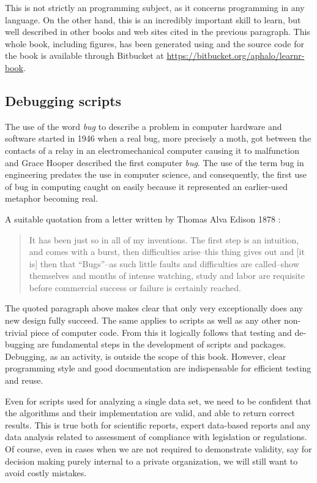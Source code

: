 \documentclass[krantz2]{krantz}\usepackage{knitr}
\begin{document}
This is not strictly an \Rlang programming subject, as it concerns programming in any language. On the other hand, this is an incredibly important skill to learn, but well described in other books and web sites cited in the previous paragraph. This whole book, including figures, has been generated using  and the source code for the book is available through Bitbucket at \url{https://bitbucket.org/aphalo/learnr-book}.

\subsection{Debugging scripts}\label{sec:script:debug}

The use of the word \emph{bug} to describe a problem in computer hardware and software started in 1946 when a real bug, more precisely a moth, got between the contacts of a relay in an electromechanical computer causing it to malfunction and Grace Hooper described the first computer \emph{bug}. The use of the term bug in engineering predates the use in computer science, and consequently, the first use of bug in computing caught on easily because it represented an earlier-used metaphor becoming real.

A suitable quotation from a letter written by Thomas Alva Edison 1878 \autocite[as given by][]{Hughes2004}:
\begin{quotation}
  It has been just so in all of my inventions. The first step is an intuition, and comes with a burst, then difficulties arise--this thing gives out and [it is] then that ``Bugs''--as such little faults and difficulties are called--show themselves and months of intense watching, study and labor are requisite before commercial success or failure is certainly reached.
\end{quotation}

The quoted paragraph above makes clear that only very exceptionally does any new design fully succeed. The same applies to \Rlang scripts as well as any other non-trivial piece of computer code. From this it logically follows that testing and de-bugging are fundamental steps in the development of \Rlang scripts and packages. Debugging, as an activity, is outside the scope of this book. However, clear programming style and good documentation are indispensable for efficient testing and reuse.

Even for scripts used for analyzing a single data set, we need to be confident that the algorithms and their implementation are valid, and able to return correct results. This is true both for scientific reports, expert data-based reports and any data analysis related to assessment of compliance with legislation or regulations. Of course, even in cases when we are not required to demonstrate validity, say for decision making purely internal to a private organization, we will still want to avoid costly mistakes.
\end{document}
